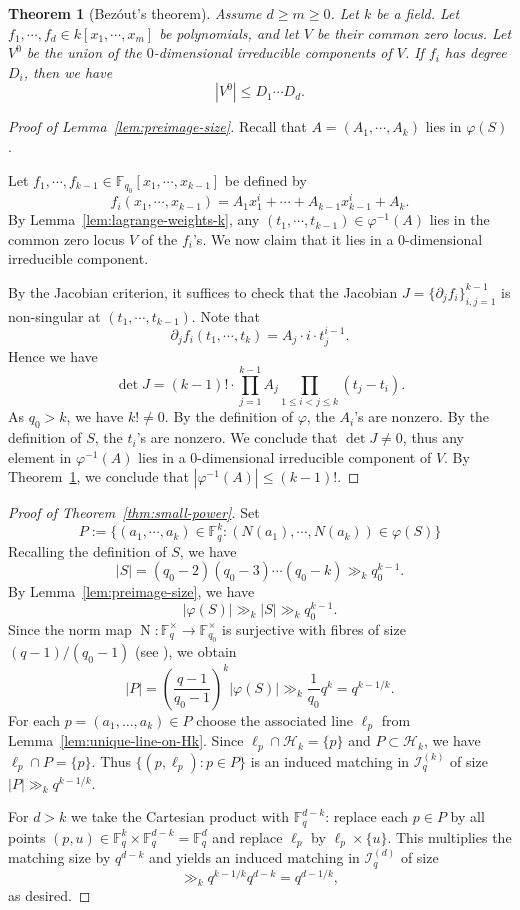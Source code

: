 \documentclass[12pt,reqno]{amsart}
\theoremstyle{plain}
\newtheorem{theorem}{Theorem}[section]
\theoremstyle{definition}
\newcommand{\F}{\mathbb{F}}
\newcommand{\II}{\mathcal{I}}
\newcommand{\1}{\mathbf{1}}
\newcommand{\abs}[1]{\left|#1\right|}
\DeclareMathOperator{\Norm}{N}
\begin{document}
\begin{theorem}[Bez\'out's theorem]
    \label{thm:bezout}
    Assume $d \geq m \geq 0$. Let $k$ be a field. Let $f_1, \cdots, f_d \in k[x_1, \cdots, x_m]$ be polynomials, and let $V$ be their common zero locus. Let $V^0$ be the union of the $0$-dimensional irreducible components of $V$. If $f_i$ has degree $D_i$, then we have
    $$|V^0| \leq D_1 \cdots D_d.$$
\end{theorem}
\begin{proof}[Proof of Lemma~\ref{lem:preimage-size}]

Recall that $A = (A_1, \cdots, A_k)$ lies in $\varphi(S)$. 

Let $f_1, \cdots, f_{k - 1} \in \F_{q_0}[x_1, \cdots, x_{k - 1}]$ be defined by
$$f_i(x_1, \cdots, x_{k - 1}) = A_1 x_1^{i} + \cdots + A_{k - 1}x_{k - 1}^i + A_k.$$
By Lemma~\ref{lem:lagrange-weights-k}, any $(t_1, \cdots, t_{k - 1}) \in \varphi^{-1}(A)$ lies in the common zero locus $V$ of the $f_i$'s. We now claim that it lies in a $0$-dimensional irreducible component. 

By the Jacobian criterion, it suffices to check that the Jacobian $J = \{\partial_j f_i\}_{i, j = 1}^{k - 1}$ is non-singular at $(t_1, \cdots, t_{k - 1})$. Note that
$$\partial_j f_i(t_1, \cdots, t_k) = A_j \cdot i \cdot t_{j}^{i - 1}.$$
Hence we have
$$\det J = (k - 1)! \cdot \prod_{j = 1}^{k - 1} A_j \prod_{1 \leq i < j \leq k} (t_j - t_i).$$
As $q_0 > k$, we have $k! \neq 0$. By the definition of $\varphi$, the $A_i$'s are nonzero. By the definition of $S$, the $t_i$'s are nonzero. We conclude that $\det J \neq 0$, thus any element in $\varphi^{-1}(A)$ lies in a $0$-dimensional irreducible component of $V$. By Theorem~\ref{thm:bezout}, we conclude that $\abs{\varphi^{-1}(A)} \leq (k - 1)!$.

\end{proof}

\begin{proof}[Proof of Theorem~\ref{thm:small-power}]
Set
$$
  P := \{(a_1, \cdots, a_k) \in \F_q^k: (N(a_1), \cdots, N(a_k)) \in \varphi(S)\}
$$
Recalling the definition of $S$, we have
$$\abs{S} = (q_0 - 2) (q_0 - 3) \cdots (q_0 - k) \gg_k q_0^{k - 1}.$$
By Lemma~\ref{lem:preimage-size}, we have
$$\abs{\varphi(S)} \gg_k \abs{S} \gg_k q_0^{k - 1}.$$
Since the norm map $\Norm:\F_q^\times\to \F_{q_0}^\times$ is surjective with fibres of size $(q-1)/(q_0-1)$ (see \cite[Ch.~2]{LidlNiederreiter1997}), we obtain
$$\abs{P} = \left(\frac{q - 1}{q_0 - 1}\right)^{k}\abs{\varphi(S)} \gg_k \frac{1}{q_0} q^{k} = q^{k - 1/k}.$$
For each $p=(a_1,\dots,a_k)\in P$ choose the associated line $\ell_p$ from Lemma~\ref{lem:unique-line-on-Hk}.
Since $\ell_p\cap\mathcal{H}_k=\{p\}$ and $P\subset\mathcal{H}_k$, we have $\ell_p\cap P=\{p\}$.
Thus $\{(p,\ell_p):p\in P\}$ is an induced matching in $\II_q^{(k)}$ of size $|P|\gg_k q^{k-1/k}$.

For $d>k$ we take the Cartesian product with $\F_q^{d-k}$:
replace each $p\in P$ by all points $(p,u)\in\F_q^k\times\F_q^{d-k}=\F_q^d$ and replace $\ell_p$ by $\ell_p\times\{u\}$.
This multiplies the matching size by $q^{d-k}$ and yields an induced matching in $\II_q^{(d)}$ of size
\[
  \gg_k q^{k-1/k}q^{d-k} = q^{d-1/k},
\]
as desired.
\end{proof}
\end{document}
